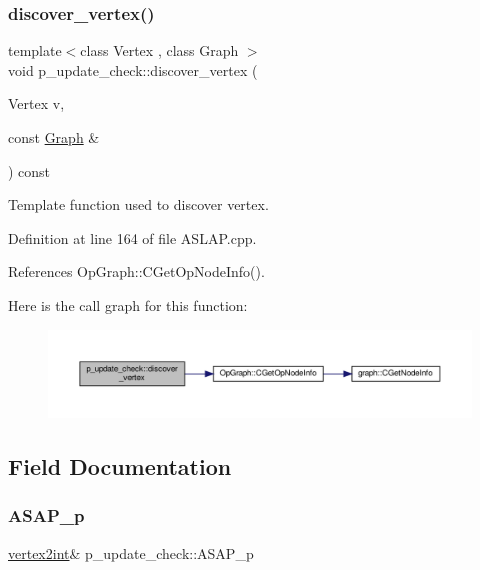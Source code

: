 \subsubsection{\texorpdfstring{discover\+\_\+vertex()}{discover\_vertex()}}
{\footnotesize\ttfamily template$<$class Vertex , class Graph $>$ \\
void p\+\_\+update\+\_\+check\+::discover\+\_\+vertex (\begin{DoxyParamCaption}\item[{Vertex}]{v,  }\item[{const \hyperlink{structGraph}{Graph} \&}]{ }\end{DoxyParamCaption}) const\hspace{0.3cm}{\ttfamily [inline]}}



Template function used to discover vertex. 



Definition at line 164 of file A\+S\+L\+A\+P.\+cpp.



References Op\+Graph\+::\+C\+Get\+Op\+Node\+Info().

Here is the call graph for this function\+:
\nopagebreak
\begin{figure}[H]
\begin{center}
\leavevmode
\includegraphics[width=350pt]{d6/d32/structp__update__check_af49822a0e6841ca43018a41786178b4f_cgraph}
\end{center}
\end{figure}


\subsection{Field Documentation}
\mbox{\label{structp__update__check_a3604a79f6598f721d36e5cf54852eec1}} 
\subsubsection{\texorpdfstring{A\+S\+A\+P\+\_\+p}{ASAP\_p}}
{\footnotesize\ttfamily \hyperlink{structvertex2int}{vertex2int}\& p\+\_\+update\+\_\+check\+::\+A\+S\+A\+P\+\_\+p\hspace{0.3cm}{\ttfamily [private]}}



